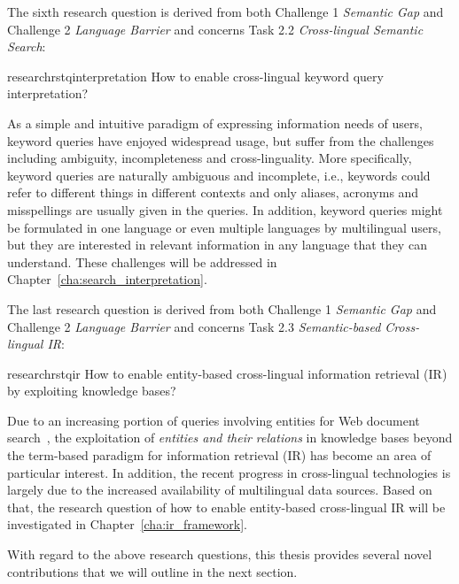 \noindent The sixth research question is derived from both Challenge 1 \emph{Semantic Gap} and Challenge 2 \emph{Language Barrier} and concerns Task 2.2 \emph{Cross-lingual Semantic Search}:

\begin{restatable}{research}{rstqinterpretation} \label{q:interpretation}
How to enable cross-lingual keyword query interpretation?
\end{restatable}
\vspace{-0.9em}
As a simple and intuitive paradigm of expressing information needs of users, keyword queries have enjoyed widespread usage, but suffer from the challenges including ambiguity, incompleteness and cross-linguality. More specifically, keyword queries are naturally ambiguous and incomplete, i.e., keywords could refer to different things in different contexts and only aliases, acronyms and misspellings are usually given in the queries. In addition, keyword queries might be formulated in one language or even multiple languages by multilingual users, but they are interested in relevant information in any language that they can understand. 
These challenges will be addressed in Chapter~\ref{cha:search_interpretation}.

\noindent The last research question is derived from both Challenge 1 \emph{Semantic Gap} and Challenge 2 \emph{Language Barrier} and concerns Task 2.3 \emph{Semantic-based Cross-lingual IR}:

\begin{restatable}{research}{rstqir} \label{q:ir}
How to enable entity-based cross-lingual information retrieval (IR) by exploiting knowledge bases?
\end{restatable}
\vspace{-0.9em}
Due to an increasing portion of queries involving entities for Web document search~\cite{DBLP:conf/www/PoundMZ10}, the exploitation of \emph{entities and their relations} in knowledge bases beyond the term-based paradigm for information retrieval (IR) has become an area of particular interest.
In addition, the recent progress in cross-lingual technologies is largely due to the increased availability of multilingual data sources. 
Based on that, the research question of how to enable entity-based cross-lingual IR will be investigated in Chapter~\ref{cha:ir_framework}.

With regard to the above research questions, this thesis provides several novel contributions that we will outline in the next section.
